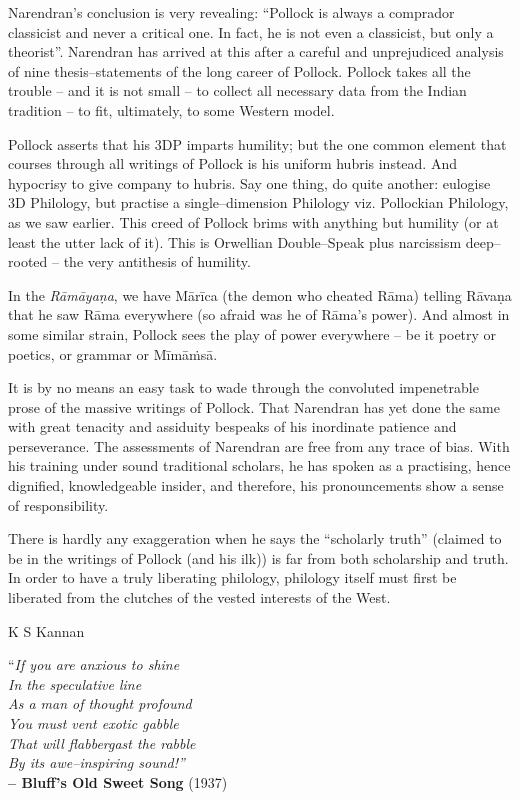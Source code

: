 Narendran’s conclusion is very revealing: “Pollock is always a comprador classicist and never a critical one. In fact, he is not even a classicist, but only a theorist”. Narendran has arrived at this after a careful and unprejudiced analysis of nine thesis–statements of the long career of Pollock. Pollock takes all the trouble – and it is not small – to collect all necessary data from the Indian tradition – to fit, ultimately, to some Western model.

Pollock asserts that his 3DP imparts humility; but the one common element that courses through all writings of Pollock is his uniform hubris instead. And hypocrisy to give company to hubris. Say one thing, do quite another: eulogise 3D Philology, but practise a single–dimension Philology viz. Pollockian Philology, as we saw earlier. This creed of Pollock brims with anything but humility (or at least the utter lack of it). This is Orwellian Double–Speak plus narcissism deep–rooted – the very antithesis of humility.

In the \textit{Rāmāyaṇa}, we have Mārīca (the demon who cheated Rāma) telling Rāvaṇa that he saw Rāma everywhere (so afraid was he of Rāma’s power). And almost in some similar strain, Pollock sees the play of power everywhere – be it poetry or poetics, or grammar or Mīmāṁsā.

It is by no means an easy task to wade through the convoluted impenetrable prose of the massive writings of Pollock. That Narendran has yet done the same with great tenacity and assiduity bespeaks of his inordinate patience and perseverance. The assessments of Narendran are free from any trace of bias. With his training under sound traditional scholars, he has spoken as a practising, hence dignified, knowledgeable insider, and therefore, his pronouncements show a sense of responsibility.

There is hardly any exaggeration when he says the “scholarly truth” (claimed to be in the writings of Pollock (and his ilk)) is far from both scholarship and truth. In order to have a truly liberating philology, philology itself must first be liberated from the clutches of the vested interests of the West.

K S Kannan

\delimiter

\begin{center}
“\textit{If you are anxious to shine\\ In the speculative line\\ As a man of thought profound\\ You must vent exotic gabble\\ That will flabbergast the rabble\\ By its awe–inspiring sound!”}\\\textbf{ – Bluff’s Old Sweet Song} (1937)
\end{center}

